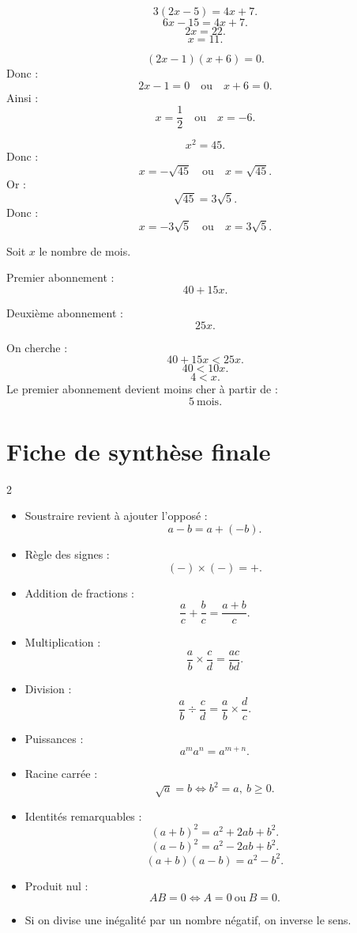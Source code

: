 \documentclass[11pt,a4paper]{article}
\newcounter{correction}
\newcommand{\encadre}[1]{\boxed{\displaystyle #1}}
\begin{document}
\begin{correction}
\[
3(2x-5)=4x+7.
\]
\[
6x-15=4x+7.
\]
\[
2x=22.
\]
\[
x=11.
\]

\[
(2x-1)(x+6)=0.
\]
Donc :
\[
2x-1=0 \quad \text{ou} \quad x+6=0.
\]
Ainsi :
\[
x=\frac12 \quad \text{ou} \quad x=-6.
\]

\[
x^2=45.
\]
Donc :
\[
x=-\sqrt{45} \quad \text{ou} \quad x=\sqrt{45}.
\]
Or :
\[
\sqrt{45}=3\sqrt5.
\]
Donc :
\[
x=-3\sqrt5 \quad \text{ou} \quad x=3\sqrt5.
\]
\end{correction}

\begin{correction}
Soit $x$ le nombre de mois.

Premier abonnement :
\[
40+15x.
\]

Deuxième abonnement :
\[
25x.
\]

On cherche :
\[
40+15x<25x.
\]
\[
40<10x.
\]
\[
4<x.
\]
Le premier abonnement devient moins cher à partir de :
\[
\encadre{5\ \text{mois}}.
\]
\end{correction}

\newpage

\section{Fiche de synthèse finale}

\begin{tcolorbox}[colframe=bleu,colback=blue!3!white,title=À retenir absolument]
\begin{multicols}{2}
\begin{itemize}
  \item Soustraire revient à ajouter l'opposé :
  \[
  a-b=a+(-b).
  \]
  \item Règle des signes :
  \[
  (-)\times(-)=+.
  \]
  \item Addition de fractions :
  \[
  \frac{a}{c}+\frac{b}{c}=\frac{a+b}{c}.
  \]
  \item Multiplication :
  \[
  \frac{a}{b}\times\frac{c}{d}=\frac{ac}{bd}.
  \]
  \item Division :
  \[
  \frac{a}{b}\div\frac{c}{d}
  =
  \frac{a}{b}\times\frac{d}{c}.
  \]
  \item Puissances :
  \[
  a^m a^n=a^{m+n}.
  \]
  \item Racine carrée :
  \[
  \sqrt a=b \Longleftrightarrow b^2=a,\ b\geq0.
  \]
  \item Identités remarquables :
  \[
  (a+b)^2=a^2+2ab+b^2.
  \]
  \[
  (a-b)^2=a^2-2ab+b^2.
  \]
  \[
  (a+b)(a-b)=a^2-b^2.
  \]
  \item Produit nul :
  \[
  AB=0\Longleftrightarrow A=0\ \text{ou}\ B=0.
  \]
  \item Si on divise une inégalité par un nombre négatif, on inverse le sens.
\end{itemize}
\end{multicols}
\end{tcolorbox}
\end{document}
